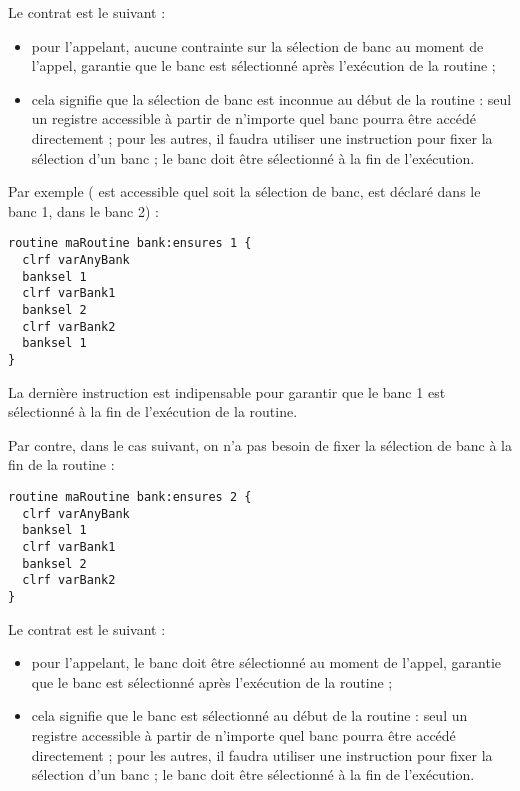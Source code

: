 Le contrat est le suivant :
\begin{itemize}
  \item pour l'appelant, aucune contrainte sur la sélection de banc au moment de l'appel, garantie que le banc  est sélectionné après l'exécution de la routine ; 
  \item cela signifie que la sélection de banc est inconnue au début de la routine : seul un registre accessible à partir de n'importe quel banc pourra être accédé directement ; pour les autres, il faudra utiliser une instruction  pour fixer la sélection d'un banc ; le banc  doit être sélectionné à la fin de l'exécution.
\end{itemize}

Par exemple ( est accessible quel soit la sélection de banc,  est déclaré dans le banc 1,  dans le banc 2) :
\begin{lstlisting}[language=piccolo]
routine maRoutine bank:ensures 1 {
  clrf varAnyBank
  banksel 1
  clrf varBank1
  banksel 2
  clrf varBank2
  banksel 1
}
\end{lstlisting}

La dernière instruction  est indipensable pour garantir que le banc 1 est sélectionné à la fin de l'exécution de la routine.


Par contre, dans le cas suivant, on n'a pas besoin de fixer la sélection de banc à la fin de la routine :
\begin{lstlisting}[language=piccolo]
routine maRoutine bank:ensures 2 {
  clrf varAnyBank
  banksel 1
  clrf varBank1
  banksel 2
  clrf varBank2
}
\end{lstlisting}













Le contrat est le suivant :
\begin{itemize}
  \item pour l'appelant, le banc  doit être sélectionné au moment de l'appel, garantie que le banc  est sélectionné après l'exécution de la routine ; 
  \item cela signifie que le banc  est sélectionné au début de la routine : seul un registre accessible à partir de n'importe quel banc pourra être accédé directement ; pour les autres, il faudra utiliser une instruction  pour fixer la sélection d'un banc ; le banc  doit être sélectionné à la fin de l'exécution.
\end{itemize}


